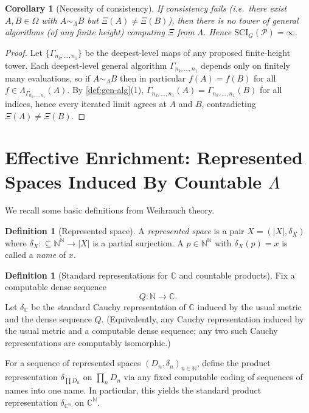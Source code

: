 \documentclass{lmcs} %
\theoremstyle{plain}
\theoremstyle{plain}
\newtheorem{corollary}[theorem]{Corollary}
\theoremstyle{definition}
\newtheorem{definition}[theorem]{Definition}
\theoremstyle{remark}
\theoremstyle{definition}
\theoremstyle{remark}
\numberwithin{equation}{section}
\newcommand{\N}{\mathbb{N}}
\newcommand{\C}{\mathbb{C}}
\newcommand{\Baire}{\N^\N}
\begin{document}
\begin{corollary}[Necessity of consistency]\label{cor:NecConsis}
If consistency fails (i.e.\ there exist $A,B\in\Omega$ with $A\sim_\Lambda B$ but $\Xi(A)\neq\Xi(B)$),
then there is no tower of general algorithms (of any finite height) computing $\Xi$ from $\Lambda$.
Hence $\mathrm{SCI}_G(\mathcal{P})=\infty$.
\end{corollary}

\begin{proof}
Let $\{\Gamma_{n_k,\dots,n_1}\}$ be the deepest-level maps of any proposed finite-height tower.
Each deepest-level general algorithm $\Gamma_{n_k,\dots,n_1}$ depends only on finitely many evaluations, so if $A\sim_\Lambda B$ then in particular
$f(A)=f(B)$ for all $f\in\Lambda_{\Gamma_{n_k,\dots,n_1}}(A)$.
By \cref{def:gen-alg}(1), $\Gamma_{n_k,\dots,n_1}(A)=\Gamma_{n_k,\dots,n_1}(B)$
for all indices, hence every iterated limit agrees at $A$ and $B$, contradicting $\Xi(A)\neq\Xi(B)$.
\end{proof}

\section{Effective Enrichment: Represented Spaces Induced By Countable \texorpdfstring{$\Lambda$}{Lambda}}{\label{sec:EffEnrich}}

We recall some basic definitions from Weihrauch theory.

\begin{definition}[Represented space]\label{def:rep-space}
A \textit{represented space} is a pair $X=(|X|,\delta_X)$ where
$\delta_X:\subseteq \Baire \to |X|$ is a partial surjection.
A $p\in\Baire$ with $\delta_X(p)=x$ is called a \textit{name} of $x$.
\end{definition}

\begin{definition}[Standard representations for $\C$ and countable products]\label{def:rep-C-product}
Fix a computable dense sequence
\[
Q:\mathbb{N}\to\mathbb{C}.
\]
Let $\delta_{\mathbb{C}}$ be the standard Cauchy representation of $\mathbb{C}$ induced by
the usual metric and the dense sequence $Q$.
(Equivalently, any Cauchy representation induced by the usual metric and a computable
dense sequence; any two such Cauchy representations are computably isomorphic.)

For a sequence of represented spaces $(D_n,\delta_n)_{n\in\N}$, define the product
representation $\delta_{\prod D_n}$ on $\prod_n D_n$ via any fixed computable coding
of sequences of names into one name. In particular, this yields the standard product
representation $\delta_{\C^\N}$ on $\C^\N$.
\end{definition}
\end{document}
